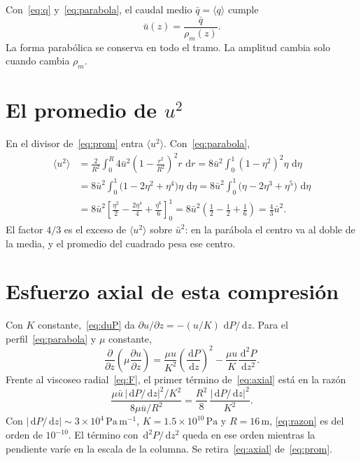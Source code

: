 \documentclass[11pt,a4paper]{article}
\newcommand{\dd}{\,\mathrm{d}}
\newcommand{\p}{\partial}
\theoremstyle{plain}
\theoremstyle{definition}
\theoremstyle{remark}
\begin{document}
Con~\eqref{eq:q} y~\eqref{eq:parabola}, el caudal medio
\(\bar q=\langle q\rangle\) cumple
\begin{equation}
\bar u(z)=\frac{\bar q}{\rho_m(z)}.
\label{eq:ubar}
\end{equation}
La forma parabólica se conserva en todo el tramo. La amplitud cambia solo
cuando cambia \(\rho_m\).

\section{El promedio de \texorpdfstring{\(u^2\)}{u al cuadrado}}

En el divisor de~\eqref{eq:prom} entra \(\langle u^2\rangle\).
Con~\eqref{eq:parabola},
\begin{align}
\langle u^2\rangle
&=
\frac{2}{R^2}\int_0^R
4\bar u^2\left(1-\frac{r^2}{R^2}\right)^2 r\,\dd r
=
8\bar u^2\int_0^1(1-\eta^2)^2\eta\,\dd\eta
\nonumber\\
&=
8\bar u^2\int_0^1\bigl(1-2\eta^2+\eta^4\bigr)\eta\,\dd\eta
=
8\bar u^2\int_0^1\bigl(\eta-2\eta^3+\eta^5\bigr)\,\dd\eta
\nonumber\\
&=
8\bar u^2\left[\frac{\eta^2}{2}-\frac{2\eta^4}{4}+\frac{\eta^6}{6}\right]_0^1
=
8\bar u^2\left(\frac12-\frac12+\frac16\right)
=
\frac{4}{3}\bar u^2.
\label{eq:u2}
\end{align}
El factor \(4/3\) es el exceso de \(\langle u^2\rangle\) sobre \(\bar u^2\):
en la parábola el centro va al doble de la media, y el promedio del cuadrado
pesa ese centro.

\section{Esfuerzo axial de esta compresión}

Con \(K\) constante,~\eqref{eq:duP} da
\(\p u/\p z=-(u/K)\,\dd P/\dd z\).
Para el perfil~\eqref{eq:parabola} y \(\mu\) constante,
\begin{equation}
\frac{\p}{\p z}\!\left(\mu\frac{\p u}{\p z}\right)
=
\frac{\mu u}{K^2}\left(\frac{\dd P}{\dd z}\right)^2
-
\frac{\mu u}{K}\frac{\dd^2 P}{\dd z^2}.
\label{eq:axial}
\end{equation}
Frente al viscoseo radial~\eqref{eq:F}, el primer término de~\eqref{eq:axial}
está en la razón
\begin{equation}
\frac{\mu\bar u\,|\dd P/\dd z|^2/K^2}{8\mu\bar u/R^2}
=
\frac{R^2}{8}\,\frac{|\dd P/\dd z|^2}{K^2}.
\label{eq:razon}
\end{equation}
Con \(|\dd P/\dd z|\sim 3\times 10^4\,\mathrm{Pa\,m^{-1}}\),
\(K=1.5\times 10^{10}\,\mathrm{Pa}\) y \(R=16\,\mathrm{m}\),
\eqref{eq:razon} es del orden de \(10^{-10}\).
El término con \(\dd^2P/\dd z^2\) queda en ese orden mientras la pendiente
varíe en la escala de la columna. Se retira~\eqref{eq:axial} de~\eqref{eq:prom}.
\end{document}
